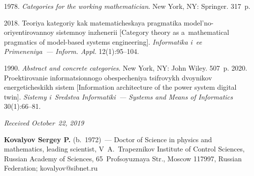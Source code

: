 \begin{multicols}{2}
{{\begin{thebibliography}{99}
 1978. \textit{Categories for the working mathematician}. New 
York, NY: Springer. 317~p.

 2018. Teoriya kategoriy kak ma\-te\-ma\-ti\-che\-skaya pragmatika 
mo\-del'\-no-ori\-yen\-ti\-ro\-van\-noy sis\-tem\-noy inzhenerii [Category theory as a~mathematical 
pragmatics of model-based systems engineering]. \textit{Informatika i~ee 
Primeneniya~--- Inform. Appl.} 12(1):95--104.

 1990. 
\textit{Abstract and concrete categories}. New York, NY: John Wiley. 507~p.
 2020. Proektirovanie informatsionnogo obespecheniya 
tsifrovykh dvoynikov energeticheskikh sistem [Information architecture of the power 
system digital twin]. \textit{Sistemy i~Sredstva Informatiki~--- Systems and Means of 
Informatics} 30(1):66--81.
\end{thebibliography}

}
}

\end{multicols}

\vspace*{-8pt}

\hfill{\small\textit{Received October~22, 2019}}



\vspace*{-26pt}

\Contrl

\vspace*{-4pt}

\noindent
\textbf{Kovalyov Sergey P.} (b.\ 1972)~--- Doctor of Science in physics and 
mathematics, leading scientist, V\, A.~Trapeznikov Institute of Control Sciences, 
Russian Academy of Sciences, 65~Profsoyuznaya Str., Moscow 117997, Russian 
Federation; \mbox{kovalyov@sibnet.ru}
\label{end\stat}

\renewcommand{\bibname}{\protect\rm Литература} 